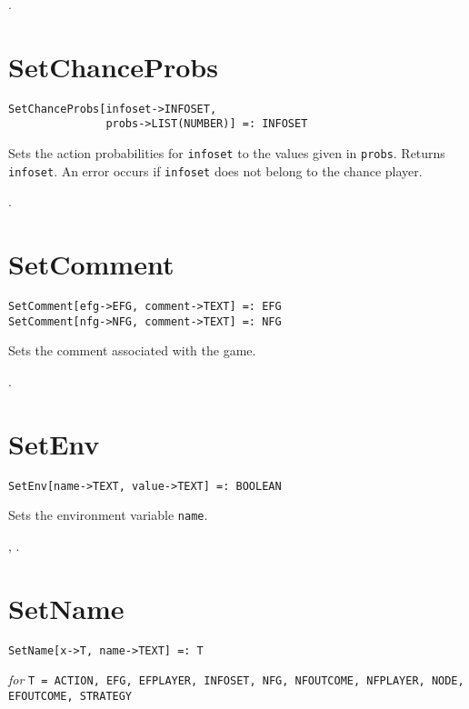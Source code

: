 \seealso {}.


\section*{SetChanceProbs}\label{PrimSetChanceProbs}
\begin{verbatim} 
SetChanceProbs[infoset->INFOSET, 
               probs->LIST(NUMBER)] =: INFOSET 
\end{verbatim}

\noindent
Sets the action probabilities for 
\verb+infoset+ to the values given in \verb+probs+.  Returns \verb+infoset+. 
An error occurs if \verb+infoset+ does not belong to the chance player.

\seealso {}.


\section*{SetComment}\label{PrimSetComment}
\begin{verbatim}
SetComment[efg->EFG, comment->TEXT] =: EFG
SetComment[nfg->NFG, comment->TEXT] =: NFG
\end{verbatim}

\noindent
Sets the comment associated with the game.

\seealso {}.


\section*{SetEnv}\label{PrimSetEnv}
\begin{verbatim}
SetEnv[name->TEXT, value->TEXT] =: BOOLEAN 
\end{verbatim}

\noindent
Sets the environment variable \verb+name+.

\seealso {}, .


\section*{SetName}\label{PrimSetName}
\begin{verbatim}
SetName[x->T, name->TEXT] =: T
\end{verbatim}
\textit{for} \texttt{T = ACTION, EFG, EFPLAYER, INFOSET, NFG, NFOUTCOME, 
NFPLAYER, NODE, EFOUTCOME, STRATEGY}

